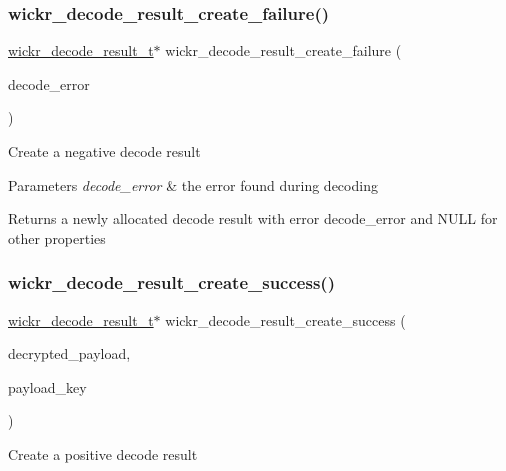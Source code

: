 \subsubsection{\texorpdfstring{wickr\_decode\_result\_create\_failure()}{wickr\_decode\_result\_create\_failure()}}
{\footnotesize\ttfamily \mbox{\hyperlink{structwickr__decode__result}{wickr\+\_\+decode\+\_\+result\+\_\+t}}$\ast$ wickr\+\_\+decode\+\_\+result\+\_\+create\+\_\+failure (\begin{DoxyParamCaption}\item[{wickr\+\_\+decode\+\_\+error}]{decode\+\_\+error }\end{DoxyParamCaption})}

Create a negative decode result


\begin{DoxyParams}{Parameters}
{\em decode\+\_\+error} & the error found during decoding \\
\hline
\end{DoxyParams}
\begin{DoxyReturn}{Returns}
a newly allocated decode result with error \textquotesingle{}decode\+\_\+error\textquotesingle{} and N\+U\+LL for other properties 
\end{DoxyReturn}
\mbox{\label{group__wickr__protocol_ga633aaf4cb6159be0110401f06dae458c}} 
\subsubsection{\texorpdfstring{wickr\_decode\_result\_create\_success()}{wickr\_decode\_result\_create\_success()}}
{\footnotesize\ttfamily \mbox{\hyperlink{structwickr__decode__result}{wickr\+\_\+decode\+\_\+result\+\_\+t}}$\ast$ wickr\+\_\+decode\+\_\+result\+\_\+create\+\_\+success (\begin{DoxyParamCaption}\item[{\mbox{\hyperlink{structwickr__payload}{wickr\+\_\+payload\+\_\+t}} $\ast$}]{decrypted\+\_\+payload,  }\item[{\mbox{\hyperlink{structwickr__cipher__key}{wickr\+\_\+cipher\+\_\+key\+\_\+t}} $\ast$}]{payload\+\_\+key }\end{DoxyParamCaption})}

Create a positive decode result


